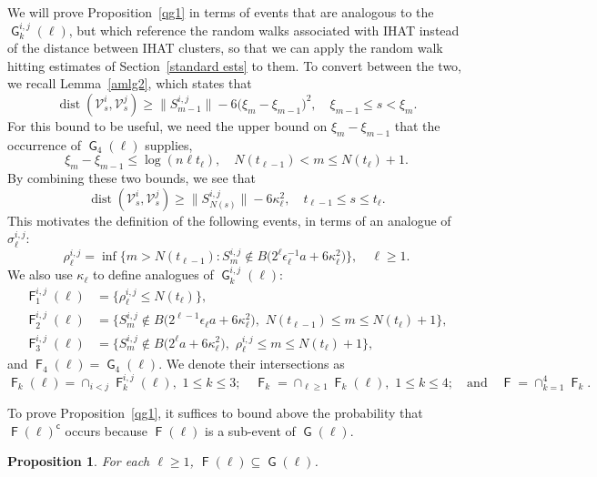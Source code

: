 \documentclass[11pt,reqno]{amsart}
\newtheorem{proposition}[lemma]{Proposition}
\theoremstyle{definition}
\numberwithin{equation}{section}
\newcommand{\1}{\mathbf{1}}
\newcommand{\eps}{\epsilon}
\DeclareMathOperator{\dist}{dist}
\newcommand{\cc}{\mathsf{c}}
\DeclareMathOperator{\GG}{\mathsf{G}}
\DeclareMathOperator{\FF}{\mathsf{F}}
\newcommand{\VV}{\mathcal{V}}
\begin{document}
We will prove Proposition~\ref{qg1} in terms of events that are analogous to the $\GG_k^{i,j} (\ell)$, but which reference the random walks associated with IHAT instead of the distance between IHAT clusters, so that we can apply the random walk hitting estimates of Section~\ref{standard ests} to them. To convert between the two, we recall Lemma~\ref{amlg2}, which states that 
\[
\dist (\VV_s^i, \VV_s^j) \geq \big\| S_{m-1}^{i,j} \big\| - 6 \big( \xi_m - \xi_{m-1} \big)^2, \quad \xi_{m-1} \leq s < \xi_m.
\]
For this bound to be useful, we need the upper bound on $\xi_m- \xi_{m-1}$ that the occurrence of $\GG_4 (\ell)$ supplies,
\[
\xi_m - \xi_{m-1} \leq \log (n \ell t_\ell), \quad N (t_{\ell-1}) < m \leq N (t_\ell) + 1.
\]
By combining these two bounds, we see that
\[
\dist (\VV_s^i, \VV_s^j) \geq \|S_{N(s)}^{i,j}\| - 6 \kappa_\ell^2, \quad t_{\ell-1} \leq s \leq t_\ell.
\]
This motivates the definition of the following events, in terms of an analogue of $\sigma_\ell^{i,j}$:
\[
\rho_\ell^{i,j} = \inf\big\{m > N (t_{\ell-1}): S_m^{i,j} \notin B \big( 2^{\ell} \eps_\ell^{-1} a + 6\kappa_\ell^2 \big)\big\}, \quad \ell \geq 1.
\]
We also use $\kappa_\ell$ to define analogues of $\GG_k^{i,j} (\ell)$: 
\begin{align*}
\FF_1^{i,j} (\ell) &= \big\{ \rho_\ell^{i,j} \leq N (t_\ell) \big\},\\ 
\FF_2^{i,j} (\ell) &= \big\{ S_m^{i,j} \notin B \big( 2^{\ell-1} \eps_\ell a + 6\kappa_\ell^2 \big),\,\,N (t_{\ell-1}) \leq m \leq N (t_\ell) + 1 \big\},\\  
\FF_3^{i,j} (\ell) &= \big\{ S_m^{i,j} \notin B \big( 2^{\ell}a + 6\kappa_\ell^2 \big),\,\, \rho_\ell^{i,j} \leq m \leq N (t_\ell) + 1 \big\},
\end{align*}
and $\FF_4 (\ell) = \GG_4 (\ell)$. 
We denote their intersections as
\[
\FF_k (\ell) = \cap_{i<j} \FF_k^{i,j} (\ell), \,\, 1 \leq k \leq 3; \quad \FF_k = \cap_{\ell \geq 1} \FF_k (\ell), \,\, 1 \leq k \leq 4; \quad \text{and} \quad \FF = \cap_{k=1}^4 \FF_k.
\]

To prove Proposition~\ref{qg1}, it suffices to bound above the probability that $\FF (\ell)^\cc$ occurs because $\FF (\ell)$ is a sub-event of $\GG (\ell)$.

\begin{proposition}\label{h sub g}
For each $\ell \geq 1$, $\FF (\ell) \subseteq \GG (\ell)$.
\end{proposition}
\end{document}
